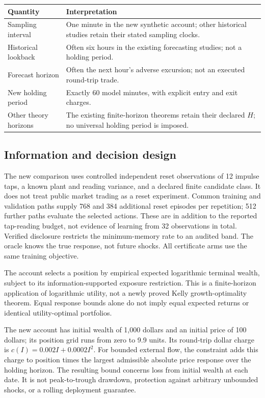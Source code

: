 \begin{center}\small
\begin{tabular}{p{}p{}}
\toprule
Quantity & Interpretation\\
\midrule
Sampling interval & One minute in the new synthetic account; other historical studies retain their stated sampling clocks.\\
Historical lookback & Often six hours in the existing forecasting studies; not a holding period.\\
Forecast horizon & Often the next hour's adverse excursion; not an executed round-trip trade.\\
New holding period & Exactly 60 model minutes, with explicit entry and exit charges.\\
Other theory horizons & The existing finite-horizon theorems retain their declared $H$; no universal holding period is imposed.\\
\bottomrule
\end{tabular}
\end{center}

\subsection*{Information and decision design}
The new comparison uses controlled independent reset observations of 12 impulse
taps, a known plant and reading variance, and a declared finite candidate class.
It does not treat public market trading as a reset experiment. Common training
and validation paths supply 768 and 384 additional reset episodes per repetition;
512 further paths evaluate the selected actions. These are in addition to the
reported tap-reading budget, not evidence of learning from 32 observations in
total. Verified disclosure restricts
the minimum-memory rate to an audited band. The oracle knows the true response,
not future shocks. All certificate arms use the same training objective.

The account selects a position by empirical expected logarithmic terminal
wealth, subject to its information-supported exposure restriction. This is a
finite-horizon application of logarithmic utility, not a newly proved Kelly
growth-optimality theorem. Equal response bounds alone do not imply equal
expected returns or identical utility-optimal portfolios.

The new account has initial wealth of 1,000 dollars and an initial price of
100 dollars; its position grid runs from zero to 9.9 units. Its round-trip
dollar charge is $c(I)=0.002I+0.0002I^2$. For bounded external flow, the
constraint adds this charge to position times the largest admissible absolute
price response over the holding horizon. The resulting bound concerns loss
from initial wealth at each date. It is not peak-to-trough drawdown, protection
against arbitrary unbounded shocks, or a rolling deployment guarantee.

